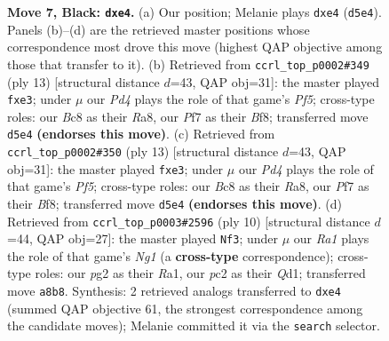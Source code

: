 \documentclass[11pt]{article}
\begin{document}
\begin{figure}[p]
\caption{\textbf{Move 7, Black: \texttt{dxe4}.} (a) Our position; Melanie plays \texttt{dxe4} (\texttt{d5e4}). Panels (b)--(d) are the retrieved master positions whose correspondence most drove this move (highest QAP objective among those that transfer to it). (b) Retrieved from \texttt{ccrl\_top\_p0002\#349} (ply 13) [structural distance $d$=43, QAP obj=31]: the master played \texttt{fxe3}; under $\mu$ our \emph{Pd4} plays the role of that game's \emph{Pf5}; cross-type roles: our \emph{B}c8 as their \emph{R}a8, our \emph{P}f7 as their \emph{B}f8; transferred move \texttt{d5e4} \textbf{(endorses this move)}. (c) Retrieved from \texttt{ccrl\_top\_p0002\#350} (ply 13) [structural distance $d$=43, QAP obj=31]: the master played \texttt{fxe3}; under $\mu$ our \emph{Pd4} plays the role of that game's \emph{Pf5}; cross-type roles: our \emph{B}c8 as their \emph{R}a8, our \emph{P}f7 as their \emph{B}f8; transferred move \texttt{d5e4} \textbf{(endorses this move)}. (d) Retrieved from \texttt{ccrl\_top\_p0003\#2596} (ply 10) [structural distance $d$=44, QAP obj=27]: the master played \texttt{Nf3}; under $\mu$ our \emph{Ra1} plays the role of that game's \emph{Ng1} (a \textbf{cross-type} correspondence); cross-type roles: our \emph{p}g2 as their \emph{R}a1, our \emph{p}c2 as their \emph{Q}d1; transferred move \texttt{a8b8}. Synthesis: 2 retrieved analogs transferred to \texttt{dxe4} (summed QAP objective 61, the strongest correspondence among the candidate moves); Melanie committed it via the \texttt{search} selector.}
\label{fig:thought-m13}
\end{figure}

\clearpage
\end{document}
